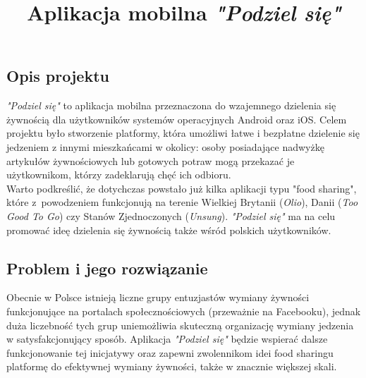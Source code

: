 \documentclass[11pt]{article}
\author{\vspace{-5ex}}
\date{\vspace{-11ex}}
\title{\textbf{Aplikacja mobilna \textit{"Podziel się"}}}
\begin{document}
\maketitle

\subsection*{Opis projektu}
\textit{"Podziel się"} to aplikacja mobilna przeznaczona do wzajemnego dzielenia się żywnością dla użytkowników systemów operacyjnych Android oraz iOS. Celem projektu było stworzenie platformy, która umożliwi łatwe i bezpłatne dzielenie się jedzeniem z innymi mieszkańcami w okolicy: osoby posiadające nadwyżkę artykułów żywnościowych lub gotowych potraw mogą przekazać je użytkownikom, którzy zadeklarują chęć ich odbioru.
\vspace{2mm}\\Warto podkreślić, że dotychczas powstało już kilka aplikacji typu "food sharing", które z~powodzeniem funkcjonują na terenie Wielkiej Brytanii (\textit{Olio}), Danii (\textit{Too Good To Go}) czy Stanów Zjednoczonych (\textit{Unsung}). \textit{"Podziel się"} ma na celu promować ideę dzielenia się żywnością także wśród polskich użytkowników.

\subsection*{Problem i jego rozwiązanie}
Obecnie w Polsce istnieją liczne grupy entuzjastów wymiany żywności funkcjonujące na portalach społecznościowych (przeważnie na Facebooku), jednak duża liczebność tych grup uniemożliwia skuteczną organizację wymiany jedzenia w satysfakcjonujący sposób. Aplikacja \textit{"Podziel się"} będzie wspierać dalsze funkcjonowanie tej inicjatywy oraz zapewni zwolennikom idei food sharingu platformę do efektywnej wymiany żywności, także w znacznie większej skali.
\end{document}
